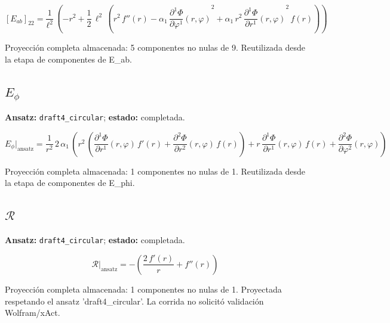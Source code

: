 \documentclass[11pt]{article}
\begin{document}
\par\smallskip
\begin{dmath*}[breakdepth={5}]
\left[E_{ab}\right]_{22} = \frac{1}{{\ell}^{2}}\,\left(-{r}^{2} + \frac{1}{2}\,{\ell}^{2}\,\left({r}^{2}\,f''\!\left(r\right) - \alpha_{1}\,{\frac{\partial^{1} \Phi}{\partial \varphi^{1}}\!\left(r, \varphi\right)}^{2} + \alpha_{1}\,{r}^{2}\,{\frac{\partial^{1} \Phi}{\partial r^{1}}\!\left(r, \varphi\right)}^{2}\,f\!\left(r\right)\right)\right)
\end{dmath*}
\par\smallskip
Proyección completa almacenada: 5 componentes no nulas de 9. Reutilizada desde la etapa de componentes de E\_ab.\par\medskip
{}
\subsection*{$ E_{\phi} $}
\textbf{Ansatz:} \texttt{draft4\_circular}; \textbf{estado:} completada.\par
\begin{dmath*}[breakdepth={5}]
E_{\phi}\big|_{\mathrm{ansatz}} = \frac{1}{{r}^{2}}\,2\,\alpha_{1}\,\left({r}^{2}\,\left(\frac{\partial^{1} \Phi}{\partial r^{1}}\!\left(r, \varphi\right)\,f'\!\left(r\right) + \frac{\partial^{2} \Phi}{\partial r^{2}}\!\left(r, \varphi\right)\,f\!\left(r\right)\right) + r\,\frac{\partial^{1} \Phi}{\partial r^{1}}\!\left(r, \varphi\right)\,f\!\left(r\right) + \frac{\partial^{2} \Phi}{\partial \varphi^{2}}\!\left(r, \varphi\right)\right)
\end{dmath*}
\par\smallskip
Proyección completa almacenada: 1 componentes no nulas de 1. Reutilizada desde la etapa de componentes de E\_phi.\par\medskip
{}
\subsection*{$ \mathcal{R} $}
\textbf{Ansatz:} \texttt{draft4\_circular}; \textbf{estado:} completada.\par
\begin{dmath*}[breakdepth={5}]
\mathcal{R}\big|_{\mathrm{ansatz}} = -\left(\frac{2\,f'\!\left(r\right)}{r} + f''\!\left(r\right)\right)
\end{dmath*}
\par\smallskip
Proyección completa almacenada: 1 componentes no nulas de 1. Proyectada respetando el ansatz 'draft4\_circular'. La corrida no solicitó validación Wolfram/xAct.\par\medskip
{}
\end{document}
